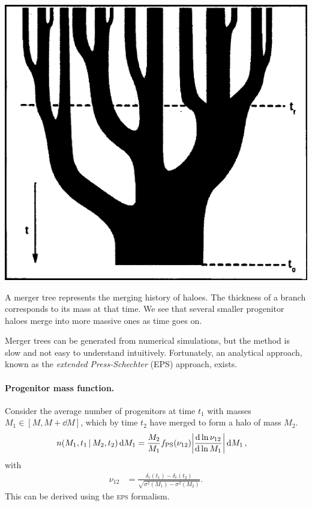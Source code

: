 \begin{marginfigure}
	\includegraphics[width=\textwidth]{img/ch-04/tree.pdf}
	\caption{A merger tree represents the merging history of haloes. The thickness of a branch corresponds to its mass at that time. We see that several smaller progenitor haloes merge into more massive ones as time goes on.}
	\label{fig:tree}
\end{marginfigure}

Merger trees can be generated from numerical simulations, but the method is slow and not easy to understand intuitively.
Fortunately, an analytical approach, known as the \emph{extended Press-Schechter} (EPS) approach, exists.

\paragraph*{Progenitor mass function.}
Consider the average number of progenitors at time $t_1$ with masses $M_1 \in [M, M + \dd{M}]$, which by time $t_2$ have merged to form a halo of mass $M_2$.
\begin{align*}
	n(M_1, t_1 \, | \, M_2, t_2) \dd{M_1}
	&= \frac{M_2}{M_1} f_\text{PS}(\nu_{12}) \abs*{\dv{\ln \nu_{12}}{\ln M_1}} \dd{M_1},
\end{align*}
with
\begin{align*}
	\nu_{12}
	&= \frac{\delta_c(t_1) - \delta_c(t_2)}{\sqrt{\sigma^2(M_1) - \sigma^2(M_2)}}.
\end{align*}
This can be derived using the \textsc{eps} formalism.

